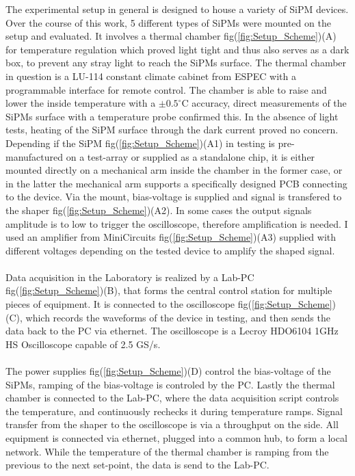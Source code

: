 \documentclass[12pt,article,type=msc,colorback,accentcolor=tud9c]{tudthesis}
\begin{document}
The experimental setup in general is designed to house a variety of SiPM devices. Over the course of this work, 5 different types of SiPMs were mounted on the setup and evaluated. It involves a thermal chamber fig(\ref{fig:Setup_Scheme})(A) for temperature regulation which proved light tight and thus also serves as a dark box, to prevent any stray light to reach the SiPMs surface. The thermal chamber in question is a LU-114 constant climate cabinet from ESPEC with a programmable interface for remote control. The chamber is able to raise and lower the inside temperature with a $\pm0.5^\circ$C accuracy, direct measurements of the SiPMs surface with a temperature probe confirmed this. In the absence of light tests, heating of the SiPM surface through the dark current proved no concern.\\ Depending if the SiPM fig(\ref{fig:Setup_Scheme})(A1) in testing is pre-manufactured on a test-array or supplied as a standalone chip, it is either mounted directly on a mechanical arm inside the chamber in the former case, or in the latter the mechanical arm supports a specifically designed PCB connecting to the device. Via the mount, bias-voltage is supplied and signal is transfered to the shaper fig(\ref{fig:Setup_Scheme})(A2). In some cases the output signals amplitude is to low to trigger the oscilloscope, therefore amplification is needed. I used an amplifier from MiniCircuits fig(\ref{fig:Setup_Scheme})(A3) supplied with different voltages depending on the tested device to amplify the shaped signal.\\\\
Data acquisition in the Laboratory is realized by a Lab-PC fig(\ref{fig:Setup_Scheme})(B), that forms the central control station for multiple pieces of equipment. It is connected to the oscilloscope fig(\ref{fig:Setup_Scheme})(C), which records the waveforms of the device in testing, and then sends the data back to the PC via ethernet. The oscilloscope is a Lecroy HDO6104 1GHz HS Oscilloscope capable of 2.5 GS/s.\\\\ The power supplies fig(\ref{fig:Setup_Scheme})(D) control the bias-voltage of the SiPMs, ramping of the bias-voltage is controled by the PC. Lastly the thermal chamber is connected to the Lab-PC, where the data acquisition script controls the temperature, and continuously rechecks it during temperature ramps. Signal transfer from the shaper to the oscilloscope is via a throughput on the side. All equipment is connected via ethernet, plugged into a common hub, to form a local network. While the temperature of the thermal chamber is ramping from the previous to the next set-point, the data is send to the Lab-PC.\\\\
\end{document}
